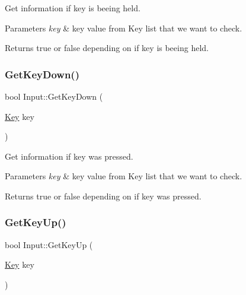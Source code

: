 Get information if key is beeing held. 


\begin{DoxyParams}{Parameters}
{\em key} & key value from Key list that we want to check. \\
\hline
\end{DoxyParams}
\begin{DoxyReturn}{Returns}
true or false depending on if key is beeing held. 
\end{DoxyReturn}
\mbox{\label{class_input_a5b29d282d8c937962865527fc886c862}} 
\subsubsection{\texorpdfstring{GetKeyDown()}{GetKeyDown()}}
{\footnotesize\ttfamily bool Input\+::\+Get\+Key\+Down (\begin{DoxyParamCaption}\item[{\mbox{\hyperlink{_input_8h_ab3c7af4820830f9166ede9e5623c4e73}{Key}}}]{key }\end{DoxyParamCaption})\hspace{0.3cm}{\ttfamily [static]}}



Get information if key was pressed. 


\begin{DoxyParams}{Parameters}
{\em key} & key value from Key list that we want to check. \\
\hline
\end{DoxyParams}
\begin{DoxyReturn}{Returns}
true or false depending on if key was pressed. 
\end{DoxyReturn}
\mbox{\label{class_input_a03ee6f16ccae40e4acf900f41e798c4a}} 
\subsubsection{\texorpdfstring{GetKeyUp()}{GetKeyUp()}}
{\footnotesize\ttfamily bool Input\+::\+Get\+Key\+Up (\begin{DoxyParamCaption}\item[{\mbox{\hyperlink{_input_8h_ab3c7af4820830f9166ede9e5623c4e73}{Key}}}]{key }\end{DoxyParamCaption})\hspace{0.3cm}{\ttfamily [static]}}



